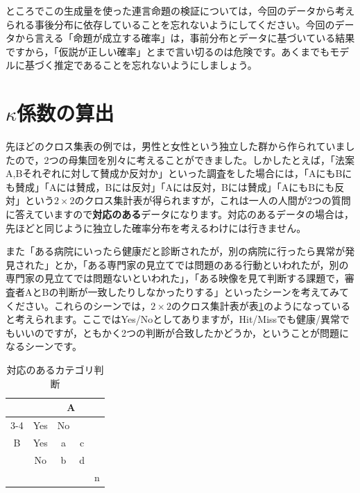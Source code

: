 \documentclass{ltjsbook}
\begin{document}
ところでこの生成量を使った連言命題の検証については，今回のデータから考えられる事後分布に依存していることを忘れないようにしてください。今回のデータから言える「命題が成立する確率」は，事前分布とデータに基づいている結果ですから，「仮説が正しい確率」とまで言い切るのは危険です。あくまでもモデルに基づく推定であることを忘れないようにしましょう。
\section{$\kappa$係数の算出}
先ほどのクロス集表の例では，男性と女性という独立した群から作られていましたので，2つの母集団を別々に考えることができました。しかしたとえば，「法案A,Bそれぞれに対して賛成か反対か」といった調査をした場合には，「AにもBにも賛成」「Aには賛成，Bには反対」「Aには反対，Bには賛成」「AにもBにも反対」という$2\times 2$のクロス集計表が得られますが，これは一人の人間が2つの質問に答えていますので\textbf{対応のある}データになります。対応のあるデータの場合は，先ほどと同じように独立した確率分布を考えるわけには行きません。

また「ある病院にいったら健康だと診断されたが，別の病院に行ったら異常が発見された」とか，「ある専門家の見立てでは問題のある行動といわれたが，別の専門家の見立てでは問題ないといわれた」，「ある映像を見て判断する課題で，審査者AとBの判断が一致したりしなかったりする」といったシーンを考えてみてください。これらのシーンでは，$2\times2$のクロス集計表が表\ref{tbl:23_03}のようになっていると考えられます。ここではYes/Noとしてありますが，Hit/Missでも健康/異常でもいいのですが，ともかく2つの判断が合致したかどうか，ということが問題になるシーンです。

\begin{table}[ht]
	\centering
	\caption{対応のあるカテゴリ判断}
	\begin{tabular}{c|c|cc|c}
		\multicolumn{2}{c|}{} & \multicolumn{2}{c|}{A}              \\
		\cline{3-4}
		\multicolumn{2}{c|}{}
		                      & Yes                    & No &       \\ \hline
		B                     & Yes                    & a  & c &   \\
		                      & No                     & b  & d &   \\ \hline
		                      &                        &    &   & n \\
	\end{tabular}
	\label{tbl:23_03}
\end{table}
\end{document}
